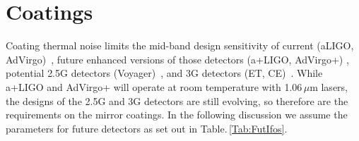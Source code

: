\chapter{Coatings}
\label{sec:Coatings}

\vspace{1cm}



Coating thermal noise limits the mid-band design sensitivity of current (\ac{aLIGO}, \ac{AdVirgo})~\cite{ AdvancedLIGO2015,AdvancedVirgo2015}, future enhanced versions of those detectors (\ac{a+LIGO}, \ac{AdVirgo+}) \cite{Zucker:LIGOAplus, Cagnoli:VirgoAplus}, potential \ac{2.5G} detectors (\ac{Voyager})~\cite{VoyagerDCC2018}, and \ac{3G} detectors (\ac{ET}, \ac{CE})~\cite{ET2011,CosmicExplorer2017}.  While \ac{a+LIGO} and \ac{AdVirgo+} will operate at room temperature with 1.06\,$\mu$m lasers, the designs of the \ac{2.5G} and \ac{3G} detectors are still evolving, so therefore are the requirements on the mirror coatings. In the following discussion we assume the parameters for future detectors as set out in Table.\,\ref{Tab:FutIfos}. 



